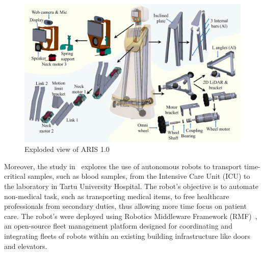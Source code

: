 \vspace{1.5em}

\begin{figure}[H]
    \centering
    \includegraphics[width=5.5in ]{pics/explod_aris.png}
    \caption[Exploded view of ARIS 1.0]{Exploded view of ARIS 1.0~\cite{nagla2020hector}}\label{ar_1}
\end{figure}

\noindent Moreover, the study in~\cite{valner2022scalable} explores the use of autonomous robots to transport time-critical samples, such as
blood samples, from the Intensive Care Unit (ICU) to the laboratory in Tartu University Hospital. The robot's objective is to automate
non-medical task, such as transporting medical items, to free healthcare professionals from secondary duties, thus allowing more time focus
on patient care. The robot's were deployed using Robotics Middleware Framework (RMF)~\cite{quigley2020ros2}, an open-source fleet management
platform designed for coordinating and integrating fleets of robots within an existing building infrastructure like doors and elevators. 

